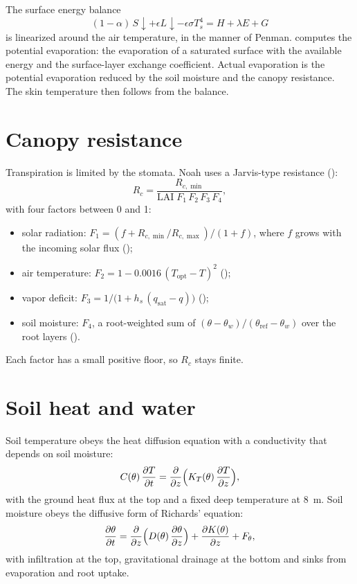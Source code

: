 The surface energy balance
\begin{equation}
  (1 - \alpha)\,S\!\downarrow + \epsilon L\!\downarrow - \epsilon\sigma T_s^4 = H + \lambda E + G
\end{equation}
is linearized around the air temperature, in the manner of Penman.  computes the potential evaporation:
the evaporation of a saturated surface with the available energy and the surface-layer exchange coefficient. Actual
evaporation is the potential evaporation reduced by the soil moisture and the canopy resistance. The skin temperature
then follows from the balance.

\section{Canopy resistance}

Transpiration is limited by the stomata. Noah uses a Jarvis-type resistance ():
\begin{equation}
  R_c = \frac{R_{c,\min}}{\mathrm{LAI}\;F_1\,F_2\,F_3\,F_4},
\end{equation}
with four factors between 0 and 1:
\begin{itemize}
  \item solar radiation: $F_1 = (f + R_{c,\min}/R_{c,\max})/(1 + f)$, where $f$ grows with the incoming solar flux
    ();
  \item air temperature: $F_2 = 1 - 0.0016\,(T_{\mathrm{opt}} - T)^2$ ();
  \item vapor deficit: $F_3 = 1/\bigl(1 + h_s\,(q_{\mathrm{sat}} - q)\bigr)$ ();
  \item soil moisture: $F_4$, a root-weighted sum of $(\theta - \theta_w)/(\theta_{\mathrm{ref}} - \theta_w)$ over the
    root layers ().
\end{itemize}
Each factor has a small positive floor, so $R_c$ stays finite.

\section{Soil heat and water}

Soil temperature obeys the heat diffusion equation with a conductivity that depends on soil moisture:
\begin{equation}
  C(\theta)\,\frac{\partial T}{\partial t} = \frac{\partial }{\partial z}\Bigl(K_T(\theta)\,\frac{\partial T}{\partial z}\Bigr),
\end{equation}
with the ground heat flux at the top and a fixed deep temperature at 8~m. Soil moisture obeys the diffusive form of
Richards' equation:
\begin{equation}
  \frac{\partial \theta}{\partial t} = \frac{\partial }{\partial z}\Bigl(D(\theta)\,\frac{\partial \theta}{\partial z}\Bigr) + \frac{\partial K(\theta)}{\partial z} + F_\theta,
\end{equation}
with infiltration at the top, gravitational drainage at the bottom and sinks from evaporation and root uptake.


